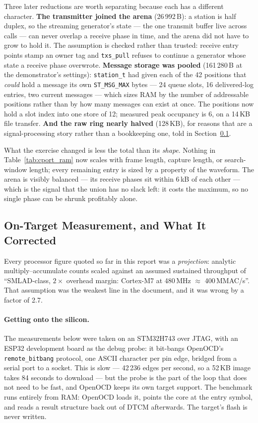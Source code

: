 Three later reductions are worth separating because each has a
different character. \textbf{The transmitter joined the arena}
(26\,992\,B): a station is half duplex, so the streaming generator's
state --- the one transmit buffer live across calls --- can never
overlap a receive phase in time, and the arena did not have to grow to
hold it. The assumption is checked rather than trusted: receive entry
points stamp an owner tag and \texttt{txs\_pull} refuses to continue a
generator whose state a receive phase overwrote. \textbf{Message
storage was pooled} (161\,280\,B at the demonstrator's settings):
\texttt{station\_t} had given each of the 42 positions that
\emph{could} hold a message its own \texttt{ST\_MSG\_MAX} bytes ---
24 queue slots, 16 delivered-log entries, two current messages --- which
sizes RAM by the number of addressable positions rather than by how many
messages can exist at once. The positions now hold a slot index into one
store of 12; measured peak occupancy is 6, on a 14\,KB file transfer.
\textbf{And the raw ring nearly halved} (128\,KB), for reasons that are
a signal-processing story rather than a bookkeeping one, told in
Section~\ref{sec:cport_ontarget}.

What the exercise changed is less the total than its \emph{shape}.
Nothing in Table~\ref{tab:cport_ram} now scales with frame length,
capture length, or search-window length; every remaining entry is sized
by a property of the waveform. The arena is visibly balanced --- its
receive phases sit within 6\,kB of each other --- which is the signal
that the union has no slack left: it costs the maximum, so no single
phase can be shrunk profitably alone.

\subsection{On-Target Measurement, and What It Corrected}
\label{sec:cport_ontarget}

Every processor figure quoted so far in this report was a
\emph{projection}: analytic multiply--accumulate counts scaled against
an assumed sustained throughput of ``SMLAD-class, $2\times$ overhead
margin: Cortex-M7 at 480\,MHz $\approx$ 400\,MMAC/s''. That assumption
was the weakest line in the document, and it was wrong by a factor of
2.7.

\paragraph{Getting onto the silicon.}
The measurements below were taken on an STM32H743 over JTAG, with an
ESP32 development board as the debug probe: it bit-bangs OpenOCD's
\texttt{remote\_bitbang} protocol, one ASCII character per pin edge,
bridged from a serial port to a socket. This is slow --- 42\,236 edges
per second, so a 52\,KB image takes 84 seconds to download --- but the
probe is the part of the loop that does not need to be fast, and
OpenOCD keeps its own target support. The benchmark runs entirely from
RAM: OpenOCD loads it, points the core at the entry symbol, and reads a
result structure back out of DTCM afterwards. The target's flash is
never written.

